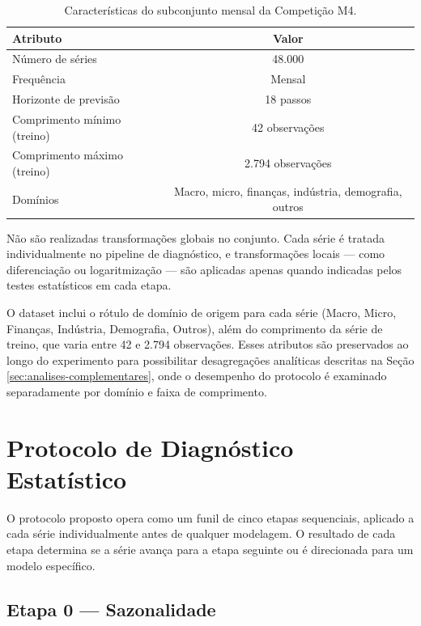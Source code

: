 \documentclass[
  12pt,
  openright,
  twoside,
  a4paper,
  english,
  brazil
]{abntex2}
\begin{document}
\begin{table}[H]
  \centering
  \caption{Características do subconjunto mensal da Competição M4.}
  \label{tab:m4-mensal}
  \begin{tabular}{lc}
    \toprule
    \textbf{Atributo} & \textbf{Valor} \\
    \midrule
    Número de séries             & 48.000 \\
    Frequência                   & Mensal \\
    Horizonte de previsão        & 18 passos \\
    Comprimento mínimo (treino)  & 42 observações \\
    Comprimento máximo (treino)  & 2.794 observações \\
    Domínios                     & Macro, micro, finanças, indústria, demografia, outros \\
    \bottomrule
  \end{tabular}
\end{table}

Não são realizadas transformações globais no conjunto. Cada série é tratada individualmente no pipeline de diagnóstico, e transformações locais — como diferenciação ou logaritmização — são aplicadas apenas quando indicadas pelos testes estatísticos em cada etapa.

O dataset inclui o rótulo de domínio de origem para cada série (Macro, Micro, Finanças, Indústria, Demografia, Outros), além do comprimento da série de treino, que varia entre 42 e 2.794 observações. Esses atributos são preservados ao longo do experimento para possibilitar desagregações analíticas descritas na Seção \ref{sec:analises-complementares}, onde o desempenho do protocolo é examinado separadamente por domínio e faixa de comprimento.

\section{Protocolo de Diagnóstico Estatístico}
\label{sec:protocolo}

O protocolo proposto opera como um funil de cinco etapas sequenciais, aplicado a cada série individualmente antes de qualquer modelagem. O resultado de cada etapa determina se a série avança para a etapa seguinte ou é direcionada para um modelo específico.

\subsection{Etapa 0 — Sazonalidade}
\label{subsec:etapa0}
\end{document}
